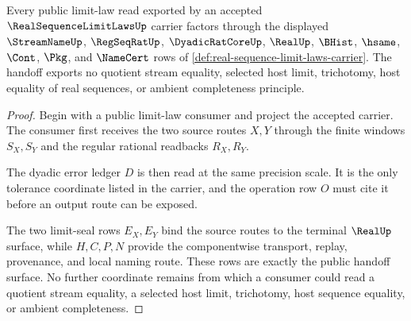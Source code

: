 \begin{theorem}
\label{thm:real-sequence-limit-laws-realup-handoff}
Every public limit-law read exported by an accepted
$\RealSequenceLimitLawsUp$ carrier factors through the displayed
$\StreamNameUp$, $\RegSeqRatUp$, $\DyadicRatCoreUp$, $\RealUp$, $\BHist$,
$\hsame$, $\Cont$, $\Pkg$, and $\NameCert$ rows of
\autoref{def:real-sequence-limit-laws-carrier}. The handoff exports no
quotient stream equality, selected host limit, trichotomy, host equality of
real sequences, or ambient completeness principle.
\end{theorem}
\begin{proof}
Begin with a public limit-law consumer and project the accepted carrier. The
consumer first receives the two source routes $X,Y$ through the finite windows
$S_X,S_Y$ and the regular rational readbacks $R_X,R_Y$.

The dyadic error ledger $D$ is then read at the same precision scale. It is the
only tolerance coordinate listed in the carrier, and the operation row $O$
must cite it before an output route can be exposed.

The two limit-seal rows $E_X,E_Y$ bind the source routes to the terminal
$\RealUp$ surface, while $H,C,P,N$ provide the componentwise transport, replay,
provenance, and local naming route. These rows are exactly the public handoff
surface. No further coordinate remains from which a consumer could read a
quotient stream equality, a selected host limit, trichotomy, host sequence
equality, or ambient completeness.
\end{proof}

